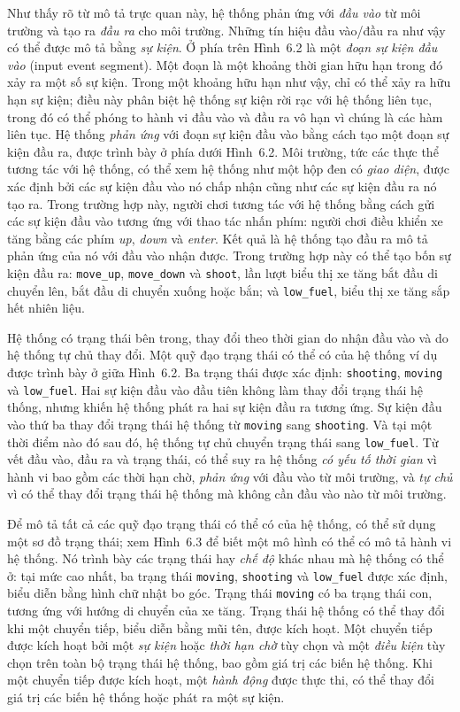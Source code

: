 Như thấy rõ từ mô tả trực quan này, hệ thống phản ứng với \emph{đầu vào} từ môi trường và tạo ra \emph{đầu ra} cho môi trường. Những tín hiệu đầu vào/đầu ra như vậy có thể được mô tả bằng \emph{sự kiện}. Ở phía trên Hình~6.2 là một \emph{đoạn sự kiện đầu vào} (input event segment). Một đoạn là một khoảng thời gian hữu hạn trong đó xảy ra một số sự kiện. Trong một khoảng hữu hạn như vậy, chỉ có thể xảy ra hữu hạn sự kiện; điều này phân biệt hệ thống sự kiện rời rạc với hệ thống liên tục, trong đó có thể phóng to hành vi đầu vào và đầu ra vô hạn vì chúng là các hàm liên tục. Hệ thống \emph{phản ứng} với đoạn sự kiện đầu vào bằng cách tạo một đoạn sự kiện đầu ra, được trình bày ở phía dưới Hình~6.2. Môi trường, tức các thực thể tương tác với hệ thống, có thể xem hệ thống như một hộp đen có \emph{giao diện}, được xác định bởi các sự kiện đầu vào nó chấp nhận cũng như các sự kiện đầu ra nó tạo ra. Trong trường hợp này, người chơi tương tác với hệ thống bằng cách gửi các sự kiện đầu vào tương ứng với thao tác nhấn phím: người chơi điều khiển xe tăng bằng các phím \emph{up}, \emph{down} và \emph{enter}. Kết quả là hệ thống tạo đầu ra mô tả phản ứng của nó với đầu vào nhận được. Trong trường hợp này có thể tạo bốn sự kiện đầu ra: \texttt{move\_up}, \texttt{move\_down} và \texttt{shoot}, lần lượt biểu thị xe tăng bắt đầu di chuyển lên, bắt đầu di chuyển xuống hoặc bắn; và \texttt{low\_fuel}, biểu thị xe tăng sắp hết nhiên liệu.

Hệ thống có trạng thái bên trong, thay đổi theo thời gian do nhận đầu vào và do hệ thống tự chủ thay đổi. Một quỹ đạo trạng thái có thể có của hệ thống ví dụ được trình bày ở giữa Hình~6.2. Ba trạng thái được xác định: \texttt{shooting}, \texttt{moving} và \texttt{low\_fuel}. Hai sự kiện đầu vào đầu tiên không làm thay đổi trạng thái hệ thống, nhưng khiến hệ thống phát ra hai sự kiện đầu ra tương ứng. Sự kiện đầu vào thứ ba thay đổi trạng thái hệ thống từ \texttt{moving} sang \texttt{shooting}. Và tại một thời điểm nào đó sau đó,
hệ thống tự chủ chuyển trạng thái sang \texttt{low\_fuel}. Từ vết đầu vào, đầu ra và trạng thái, có thể suy ra hệ thống \emph{có yếu tố thời gian} vì hành vi bao gồm các thời hạn chờ, \emph{phản ứng} với đầu vào từ môi trường, và \emph{tự chủ} vì có thể thay đổi trạng thái hệ thống mà không cần đầu vào nào từ môi trường.

Để mô tả tất cả các quỹ đạo trạng thái có thể có của hệ thống, có thể sử dụng một sơ đồ trạng thái; xem Hình~6.3 để biết một mô hình có thể có mô tả hành vi hệ thống. Nó trình bày các trạng thái hay \emph{chế độ} khác nhau mà hệ thống có thể ở: tại mức cao nhất, ba trạng thái \texttt{moving}, \texttt{shooting} và \texttt{low\_fuel} được xác định, biểu diễn bằng hình chữ nhật bo góc. Trạng thái \texttt{moving} có ba trạng thái con, tương ứng với hướng di chuyển của xe tăng. Trạng thái hệ thống có thể thay đổi khi một chuyển tiếp, biểu diễn bằng mũi tên, được kích hoạt. Một chuyển tiếp được kích hoạt bởi một \emph{sự kiện} hoặc \emph{thời hạn chờ} tùy chọn và một \emph{điều kiện} tùy chọn trên toàn bộ trạng thái hệ thống, bao gồm giá trị các biến hệ thống. Khi một chuyển tiếp được kích hoạt, một \emph{hành động} được thực thi, có thể thay đổi giá trị các biến hệ thống hoặc phát ra một sự kiện.

